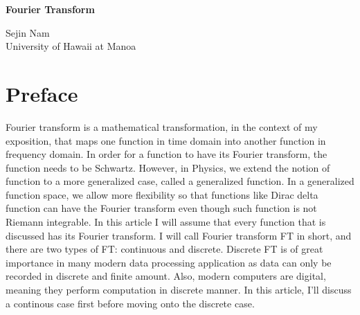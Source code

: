 \documentclass[letterpaper, 11pt]{article}
\numberwithin{equation}{section}
\numberwithin{figure}{section}
\numberwithin{table}{section}
\begin{document}
\begin{titlepage}
	\begin{center}
		\Huge{\bfseries Fourier Transform}\vfill 
	\end{center}

	\begin{flushright}
		Sejin Nam\\
		University of Hawaii at Manoa
	\end{flushright}
\end{titlepage}

\section*{\centering Preface}
Fourier transform is a mathematical transformation, in the context of my exposition, that maps one function in time domain into another function in frequency domain. In order for a function to have its Fourier transform, the function needs to be Schwartz. However, in Physics, we extend the notion of function to a more generalized case, called a generalized function. In a generalized function space, we allow more flexibility so that functions like Dirac delta function can have the Fourier transform even though such function is not Riemann integrable. In this article I will assume that every function that is discussed has its Fourier transform. I will call Fourier transform FT in short, and there are two types of FT: continuous and discrete. Discrete FT is of great importance in many modern data processing application as data can only be recorded in discrete and finite amount. Also, modern computers are digital, meaning they perform computation in discrete manner. In this article, I'll discuss a continous case first before moving onto the discrete case.
\cleardoublepage

\tableofcontents
\clearpage
\end{document}
